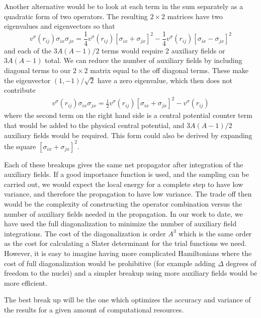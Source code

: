  Another alternative would be to look at each term in the sum separately as
 a quadratic form of two operators. The resulting $2\times 2$ matrices
 have two eigenvalues and eigenvectors so that
 \begin{equation}
 v^\sigma(r_{ij}) \sigma_{ix} \sigma_{jx}  =
 \frac{1}{4} v^\sigma(r_{ij})[\sigma_{ix}+\sigma_{jx}]^2
 -\frac{1}{4} v^\sigma(r_{ij})[\sigma_{ix}-\sigma_{jx}]^2
 \end{equation}
 and each of the $3A(A-1)/2$ terms would require 2 auxiliary fields or
 $3A(A-1)$ total. We can reduce the number of auxiliary fields by including
 diagonal terms to our $2\times 2$ matrix equal to the off diagonal terms.
 These make the eigenvector $(1,-1)/\sqrt{2}$ have a zero eigenvalue,
 which then does not contribute
 \begin{eqnarray}
 v^\sigma(r_{ij}) \sigma_{ix} \sigma_{jx}  =
 \frac{1}{2} v^\sigma(r_{ij})[\sigma_{ix}+\sigma_{jx}]^2
 -v^\sigma(r_{ij})
 \end{eqnarray}
 where the second term on the right hand side
 is a central potential counter term that would be added
 to the physical central potential, and $3A(A-1)/2$ auxiliary fields
 would be required. This form could also be derived by expanding
 the square $[\sigma_{ix}+\sigma_{jx}]^2$.
 
 Each of these breakups gives the same net propagator after integration
 of the auxiliary fields. If a good importance function is used, and the
 sampling can be carried out, we would expect the local energy for a 
 complete step to have low variance, and therefore the propagation to
 have low variance. The trade off then would be the complexity of constructing
 the operator combination versus the number of auxiliary fields needed
 in the propagation. In our work to date, we have used the full
 diagonalization to minimize the number of auxiliary field integrations.
 The cost of the diagonalization is order $A^3$ which is the same order
 as the cost for calculating a Slater determinant for the trial functions
 we need. However, it is easy to imagine having more complicated Hamiltonians
 where the cost of full diagonalization would be prohibitive (for example
 adding $\Delta$ degrees of freedom to the nuclei) and a simpler breakup
 using more auxiliary fields would be more efficient.
 
 The best break up will be the one which optimizes the accuracy and variance
 of the results for a given amount of computational resources.
 
